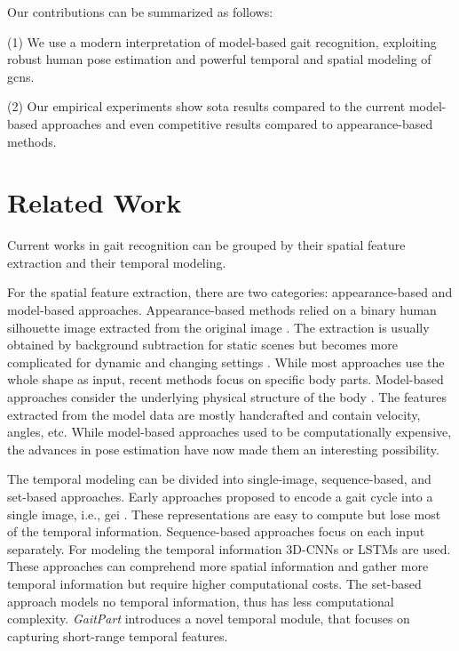 \documentclass{article}
\begin{document}
Our contributions can be summarized as follows:

(1) We use a modern interpretation of model-based gait recognition, exploiting robust human pose estimation and powerful temporal and spatial modeling of \glspl{gcn}.

(2) Our empirical experiments show \gls{sota} results compared to the current model-based approaches and even competitive results compared to appearance-based methods.


\section{Related Work}
Current works in gait recognition can be grouped by their spatial feature extraction and their temporal modeling.
 
For the spatial feature extraction, there are two categories: appearance-based and model-based approaches.
Appearance-based methods relied on a binary human silhouette image extracted from the original image \cite{wang2003silhouette}. The extraction is usually obtained by background subtraction for static scenes but becomes more complicated for dynamic and changing settings \cite{song2019gaitnet}. While most approaches \cite{chao2019gaitset, wu2016comprehensive, song2019gaitnet} use the whole shape as input, recent methods \cite{fan2020gaitpart} focus on specific body parts.
Model-based approaches consider the underlying physical structure of the body \cite{bouchrika2007model, liao2017pose, liao2020model}. The features extracted from the model data are mostly handcrafted and contain velocity, angles, etc. While model-based approaches used to be computationally expensive, the advances in pose estimation have now made them an interesting possibility.

The temporal modeling can be divided into single-image, sequence-based, and set-based approaches. Early approaches proposed to encode a gait cycle into a single image, i.e., \gls{gei} \cite{han2005individual}. These representations are easy to compute but lose most of the temporal information. Sequence-based approaches focus on each input separately. For modeling the temporal information 3D-CNNs \cite{wolf2016multi, liao2017pose} or LSTMs \cite{sokolova2018pose, liao2020model} are used. These approaches can comprehend more spatial information and gather more temporal information but require higher computational costs. The set-based approach \cite{chao2019gaitset} models no temporal information, thus has less computational complexity. \textit{GaitPart} \cite{fan2020gaitpart} introduces a novel temporal module, that focuses on capturing short-range temporal features. 
\end{document}
